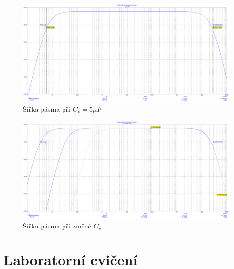\documentclass{article}
\begin{document}
\hfill
\begin{figure}[H]
  \includegraphics[width=\textwidth]{PC/BJT/Sirka_pasma.png}
  \caption{\label{prac_bod_sim_1} Šířka pásma při \(C_v = 5 \mu F\)}
\end{figure}
\begin{figure}[H]
  \includegraphics[width=\textwidth]{PC/BJT/Step_sirka_pasma.png}
  \caption{\label{prac_bod_sim_1} Šířka pásma při změně \(C_v\)}
\end{figure}

\newpage

\section{Laboratorní cvičení}
\end{document}
